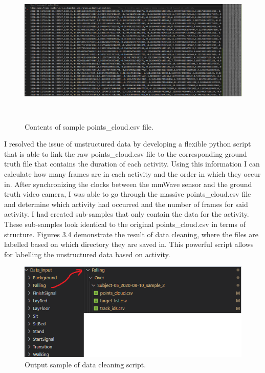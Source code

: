\begin{figure}[H]
    \centering
    \includegraphics[width=425px,height=270px]{raw_dump.png}
    \caption{Contents of sample points\_cloud.csv file.}
    \label{fig:my_label}
\end{figure}

I resolved the issue of unstructured data by developing a flexible python script that is able to link the raw points\_cloud.csv file to the corresponding ground truth file that contains the duration of each activity. Using this information I can calculate how many frames are in each activity and the order in which they occur in. After synchronizing the clocks between the mmWave sensor and the ground truth video camera, I was able to go through the massive points\_cloud.csv file and determine which activity had occurred and the number of frames for said activity. I had created sub-samples that only contain the data for the activity. These sub-samples look identical to the original points\_cloud.csv in terms of structure. Figures 3.4 demonstrate the result of data cleaning, where the files are labelled based on which directory they are saved in. This powerful script allows for labelling the unstructured data based on activity. 

\begin{figure}[H]
    \centering
    \includegraphics{result.png}
    \caption{Output sample of data cleaning script.}
    \label{fig:my_label}
\end{figure}

